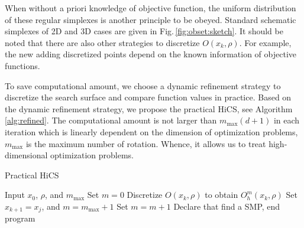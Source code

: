 \documentclass[final,1p,times]{elsarticle}
\begin{document}
When without a priori knowledge of objective function, the
uniform distribution of these regular simplexes is another
principle to be obeyed.
Standard schematic simplexes of 2D and
3D cases are given in Fig.\,\ref{fig:obset:sketch}.
It should be noted that there are also other strategies to
discretize $O(x_k,\rho)$. 
For example, the new adding discretized points 
depend on the known information of objective functions. 

To save computational amount, we choose a dynamic refinement
strategy to discretize the search surface and compare function
values in practice. 
Based on the dynamic refinement strategy, we propose the
practical HiCS, see Algorithm \ref{alg:refined}. The computational amount is not
larger than $m_{\max}(d+1)$ in each iteration which is linearly
dependent on the dimension of optimization problems,
$m_{\max}$ is the maximum number of rotation.
Whence, it allows us to treat high-dimensional optimization problems.

\begin{algorithm}[H]
	\caption{Practical HiCS}
	\label{alg:refined}
\begin{algorithmic}[1]
	\STATE Input $x_0$, $\rho$, and $m_{\max}$
		\STATE Set $m=0$
			\STATE Discretize $O(x_k,\rho)$ to obtain $O^m_h(x_k,\rho)$
				\STATE Set $x_{k+1}=x_j$, and $m=m_{\max}+1$
			\ELSE
				\STATE Set $m = m+1$
			\ENDIF
		\ELSE
			\STATE Declare that find a SMP, end program
		\ENDIF
	\ENDFOR
\end{algorithmic}
\end{algorithm}

\end{document}
